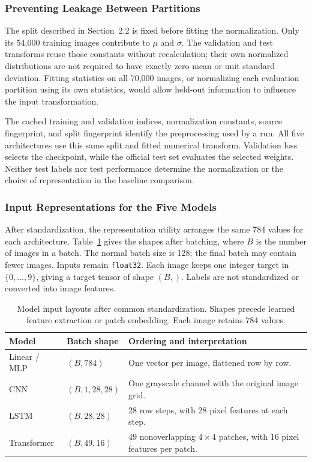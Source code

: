 \subsubsection{Preventing Leakage Between Partitions}
The split described in Section~2.2 is fixed before fitting the normalization.
Only its 54,000 training images contribute to \(\mu\) and \(\sigma\).
The validation and test transforms reuse those constants without recalculation;
their own normalized distributions are not required to have exactly zero mean
or unit standard deviation. Fitting statistics on all 70,000 images, or
normalizing each evaluation partition using its own statistics, would allow
held-out information to influence the input transformation.

The cached training and validation indices, normalization constants, source
fingerprint, and split fingerprint identify the preprocessing used by a run.
All five architectures use this same split and fitted numerical transform.
Validation loss selects the checkpoint, while the official test set evaluates
the selected weights. Neither test labels nor test performance determine the
normalization or the choice of representation in the baseline comparison.

\subsubsection{Input Representations for the Five Models}
After standardization, the representation utility arranges the same 784
values for each architecture. Table~\ref{tab:representations} gives the
shapes after batching, where \(B\) is the number of images in a batch.
The normal batch size is 128; the final batch may contain fewer images.
Inputs remain \texttt{float32}. Each image keeps one integer target in
\(\{0,\ldots,9\}\), giving a target tensor of shape \((B,)\).
Labels are not standardized or converted into image features.

\begin{table}[H]
\centering
\caption{Model input layouts after common standardization. Shapes precede
learned feature extraction or patch embedding. Each image retains 784 values.}
\label{tab:representations}
\begin{tabularx}{\linewidth}{l l X}
\toprule
Model & Batch shape & Ordering and interpretation\\
\midrule
Linear / MLP & \((B,784)\) & One vector per image, flattened row by row.\\
CNN & \((B,1,28,28)\) & One grayscale channel with the original image grid.\\
LSTM & \((B,28,28)\) & 28 row steps, with 28 pixel features at each step.\\
Transformer & \((B,49,16)\) & 49 nonoverlapping $4\times4$ patches,
with 16 pixel features per patch.\\
\bottomrule
\end{tabularx}
\end{table}

